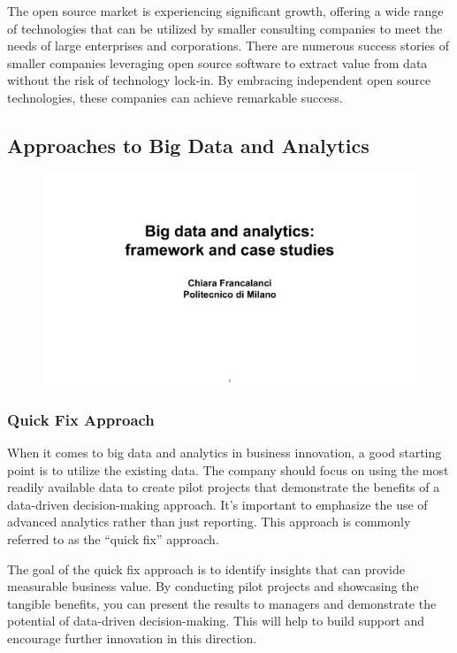 The open source market is experiencing significant growth, offering a
wide range of technologies that can be utilized by smaller consulting
companies to meet the needs of large enterprises and corporations. There
are numerous success stories of smaller companies leveraging open source
software to extract value from data without the risk of technology
lock-in. By embracing independent open source technologies, these
companies can achieve remarkable success.

\subsection{Approaches to Big Data and Analytics}

\begin{figure}[!h]
  \centering
  \includegraphics[page=63, trim = 1cm 5cm 1cm 4.5cm, clip, width=\imagewidth]{images/06 - BIG_DATA.pdf}
\end{figure}

\subsubsection{Quick Fix Approach}

When it comes to big data and analytics in business innovation, a good
starting point is to utilize the existing data. The company should focus
on using the most readily available data to create pilot projects that
demonstrate the benefits of a data-driven decision-making approach. It's
important to emphasize the use of advanced analytics rather than just
reporting. This approach is commonly referred to as the ``quick fix''
approach.

The goal of the quick fix approach is to identify insights that can
provide measurable business value. By conducting pilot projects and
showcasing the tangible benefits, you can present the results to
managers and demonstrate the potential of data-driven decision-making.
This will help to build support and encourage further innovation in this
direction.

